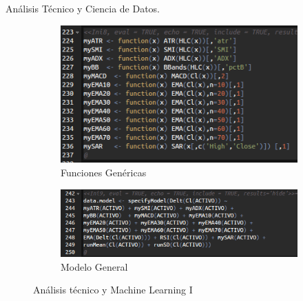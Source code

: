 \documentclass{bredelebeamer}
\begin{document}
\begin{frame}{An\'alisis T\'ecnico y Ciencia de Datos.}

\begin{figure}
\centering
\begin{subfigure}{.5\textwidth}
  \centering
  \includegraphics[width=.9\linewidth]{images/Codigo1.png}
  \caption{Funciones Gen\'ericas}
\end{subfigure}%
\begin{subfigure}{.5\textwidth}
  \centering
  \includegraphics[width=1.1\linewidth]{images/Codigo2.png}
  \caption{Modelo General}
\end{subfigure}

\vspace{.75cm}

\caption{An\'alisis t\'ecnico y Machine Learning I}
\end{figure}

\end{frame}

\end{document}
